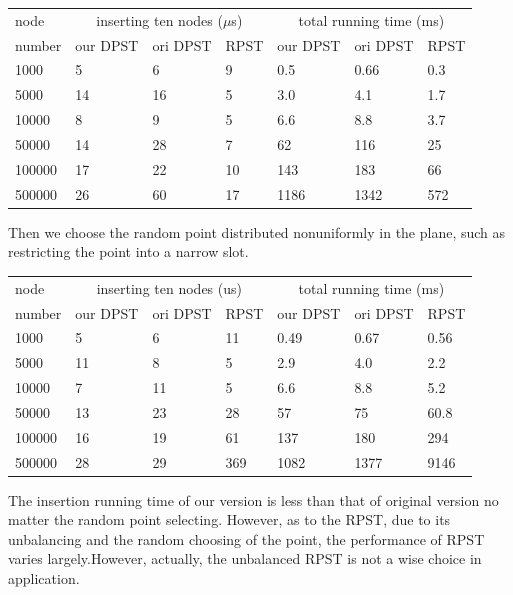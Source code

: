 \documentclass{acm_proc_article-sp}
\begin{document}
\begin{table}[ht]
\begin{tabular}{|p{1.1cm}|p{0.8cm}|p{0.8cm}|p{0.8cm}|p{0.8cm}|p{0.8cm}|p{0.8cm}|}
\hline node & \multicolumn{3}{|c|}{inserting ten nodes ($\mu$s)} & \multicolumn{3}{|c|}{total running time (ms)}\\
\cline{2-7}
number & our DPST & ori DPST  & RPST & our DPST & ori DPST & RPST\\
\hline 1000 & 5 & 6 & 9 & 0.5 & 0.66 & 0.3\\
\hline 5000 & 14 & 16 & 5 & 3.0 & 4.1 & 1.7\\
\hline 10000 & 8 & 9 & 5 & 6.6 & 8.8 & 3.7\\
\hline 50000 & 14 & 28 & 7 & 62 & 116 & 25\\
\hline 100000 & 17 & 22 & 10 & 143 & 183 & 66\\
\hline 500000 & 26 & 60 & 17 & 1186 & 1342 & 572\\
\hline
\end{tabular}
\end{table}

Then we choose the random point distributed nonuniformly in the plane, such as restricting the point into a narrow slot.\\


\begin{table}[ht]
\begin{tabular}{|p{1.1cm}|p{0.8cm}|p{0.8cm}|p{0.8cm}|p{0.8cm}|p{0.8cm}|p{0.8cm}|}
\hline node & \multicolumn{3}{|c|}{inserting ten nodes (us)} & \multicolumn{3}{|c|}{total running time (ms)}\\
\cline{2-7}
number & our DPST & ori DPST  & RPST & our DPST & ori DPST & RPST\\
\hline 1000 & 5 & 6 & 11 & 0.49 & 0.67 & 0.56\\
\hline 5000 & 11 & 8 & 5 & 2.9 & 4.0 & 2.2\\
\hline 10000 & 7 & 11 & 5 & 6.6 & 8.8 & 5.2\\
\hline 50000 & 13 & 23 & 28 & 57 & 75 & 60.8\\
\hline 100000 & 16 & 19 & 61 & 137 & 180 & 294\\
\hline 500000 & 28 & 29 & 369 & 1082 & 1377 & 9146\\
\hline
\end{tabular}
\end{table}

The insertion running time of our version is less than that of original version no matter the random point selecting. However, as to the RPST, due to its unbalancing and the random choosing of the point, the performance of RPST varies largely.However, actually, the unbalanced RPST is not a wise choice in application.
\end{document}
